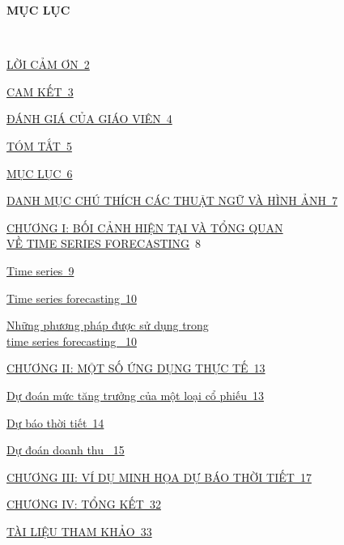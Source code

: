 
\newpage
\changefontsizes{16pt}
\centerline{\textbf{MỤC LỤC}}\

\vspace{1.2cm}
\changefontsizes{14pt}
\setlength{\parindent}{0cm}
\hyperlink{page.2}{LỜI CẢM ƠN\dotfill\ 2}

\smallskip
\hyperlink{page.3}{CAM KẾT\dotfill\ 3}

\smallskip
\hyperlink{page.4}{ĐÁNH GIÁ CỦA GIÁO VIÊN\dotfill\ 4}

\smallskip
\hyperlink{page.5}{TÓM TẮT\dotfill\ 5}

\smallskip
\hyperlink{page.6}{MỤC LỤC\dotfill\ 6}

\smallskip
\hyperlink{page.7}{DANH MỤC CHÚ THÍCH CÁC THUẬT NGỮ VÀ HÌNH ẢNH\dotfill\ 7}

\smallskip
\hyperlink{page.9}{CHƯƠNG I: BỐI CẢNH HIỆN TẠI VÀ TỔNG QUAN \\ VỀ TIME SERIES FORECASTING}\dotfill\ 8


\hyperlink{page.9}{Time series\dotfill\ 9}

\hyperlink{page.10}{Time series forecasting\dotfill\ 10}

\hyperlink{page.10}{Những phương pháp được sử dụng trong \\ time
	series forecasting \dotfill\ 10}





\smallskip
\hyperlink{page.13}{CHƯƠNG II: MỘT SỐ ỨNG DỤNG THỰC TẾ\dotfill\ 13}



\hyperlink{page.13}{Dự đoán mức tăng trưởng của một loại cổ phiếu\dotfill\ 13}

\hyperlink{page.14}{Dự báo thời tiết\dotfill\ 14}

\hyperlink{page.15}{Dự đoán doanh thu \dotfill\ 15}



\smallskip
\hyperlink{page.17}{CHƯƠNG III: VÍ DỤ MINH HỌA DỰ BÁO THỜI TIẾT\dotfill\ 17}


\smallskip
\hyperlink{page.32}{CHƯƠNG IV: TỔNG KẾT\dotfill\ 32}



\setlength{\parindent}{0cm}
\smallskip
\hyperlink{page.30}{TÀI LIỆU THAM KHẢO\dotfill\ 33}

